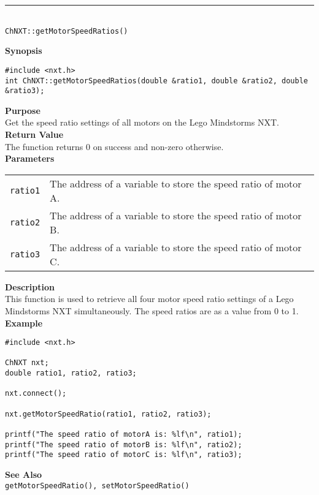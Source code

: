 \noindent
\vspace{5pt}
\rule{4.5in}{0.015in}\\
\noindent
{\LARGE \texttt{ChNXT::getMotorSpeedRatios()}}\\
{}

\noindent
{\bf Synopsis}
\begin{lstlisting}
#include <nxt.h>
int ChNXT::getMotorSpeedRatios(double &ratio1, double &ratio2, double &ratio3);
\end{lstlisting}

\noindent
{\bf Purpose}\\
Get the speed ratio settings of all motors on the Lego Mindstorms NXT.\\

\noindent
{\bf Return Value}\\
The function returns 0 on success and non-zero otherwise.\\

\noindent
{\bf Parameters}
\vspace{-0.1in}
\begin{description}
\item               
\begin{tabular}{p{10 mm}p{145 mm}}
\texttt{ratio1} & The address of a variable to store the speed ratio of motor A.\\
\texttt{ratio2} & The address of a variable to store the speed ratio of motor B.\\
\texttt{ratio3} & The address of a variable to store the speed ratio of motor C.\\
\end{tabular}
\end{description}

\noindent
{\bf Description}\\
This function is used to retrieve all four motor speed ratio settings of a Lego
Mindstorms NXT simultaneously. The speed ratios are as a value from 0 to 1. \\

\noindent
{\bf Example}
\begin{lstlisting}
#include <nxt.h>

ChNXT nxt;
double ratio1, ratio2, ratio3;

nxt.connect();

nxt.getMotorSpeedRatio(ratio1, ratio2, ratio3);

printf("The speed ratio of motorA is: %lf\n", ratio1);
printf("The speed ratio of motorB is: %lf\n", ratio2);
printf("The speed ratio of motorC is: %lf\n", ratio3);
\end{lstlisting}

\noindent
{\bf See Also}\\
\texttt{getMotorSpeedRatio(), setMotorSpeedRatio()}

